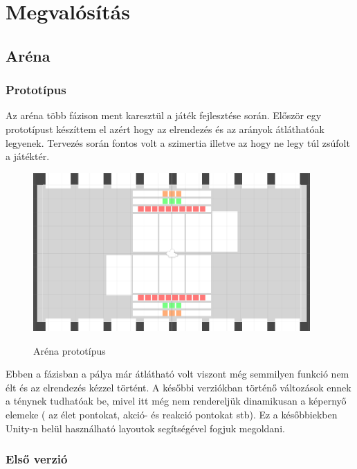 \chapter{Megvalósítás}

\section{Aréna}
\subsection{Prototípus}
Az aréna több fázison ment karesztül a játék fejlesztése során.
Először egy prototípust készíttem el azért hogy az elrendezés és az arányok átláthatóak legyenek. Tervezés során fontos volt a szimertia illetve az hogy ne legy túl zsúfolt a játéktér.

\begin{figure}[h]
        \centering
        \includegraphics[width=400px,keepaspectratio]{images/proto.png}
        \label{Proto}
        \caption {Aréna prototípus}
    \hspace{1em}
\end{figure}

Ebben a fázisban a pálya már átlátható volt viszont még semmilyen funkció nem élt és az elrendezés kézzel történt. A későbbi verziókban történő változások ennek a ténynek tudhatóak be, mivel itt még nem rendereljük dinamikusan a képernyő elemeke ( az élet pontokat, akció- és reakció pontokat stb). Ez a későbbiekben Unity-n belül használható layoutok segítségével fogjuk megoldani.

\clearpage

\subsection{Első verzió}

